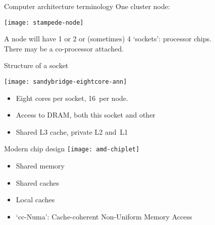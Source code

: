 
\begin{numberedframe}{Computer architecture terminology}
  One cluster node:

  \texttt{[image: stampede-node]}

  A node will have 1 or 2 or (sometimes) 4 `sockets': processor
  chips.\\
  There may be a co-processor attached.
\end{numberedframe}

\begin{numberedframe}{Structure of a socket}

  \begin{multicols}{2}
    \hbox{\texttt{[image: sandybridge-eightcore-ann]}}
    \columnbreak
    \begin{itemize}
    \item Eight cores per socket, 16~per node.
    \item Access to DRAM, both this socket and other
    \item Shared L3 cache, private L2 and~L1
    \end{itemize}
  \end{multicols}
\end{numberedframe}

\begin{numberedframe}{Modern chip design}
\texttt{[image: amd-chiplet]}
\begin{itemize}
\item Shared memory
\item Shared caches
\item Local caches
\item `cc-Numa': Cache-coherent Non-Uniform Memory Access
\end{itemize}
\end{numberedframe}

